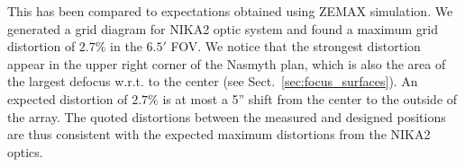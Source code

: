 This has been compared to expectations obtained using ZEMAX
simulation. 
%
%
%
%
We generated a grid diagram for NIKA2 optic system and found a maximum
grid distortion of $2.7\%$ in the $6.5'$ FOV. We notice that the
strongest distortion appear in the upper right corner of the Nasmyth plan, which is
also the area of the largest defocus w.r.t. to the center (see
Sect.~\ref{sec:focus_surfaces}).
An expected distortion of $2.7\%$ is at most a 5'' shift from the
center to the outside of the array. The quoted distortions between the
measured and designed positions are thus consistent with the expected
maximum distortions from the NIKA2 optics.



